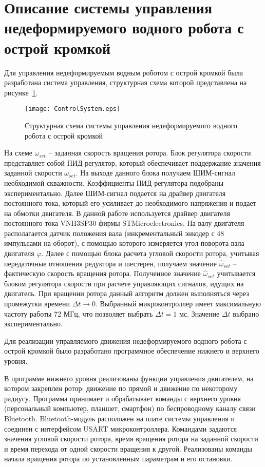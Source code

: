\section{Описание системы управления недеформируемого водного робота с острой кромкой}

Для управления недеформируемым водным роботом с острой кромкой была разработана система управления, структурная схема которой представлена на рисунке~\ref{ControlSystem}.

\begin{figure}[!h]
	\centering
	\texttt{[image: ControlSystem.eps]}
	\caption{Структурная схема системы управления недеформируемого водного робота с острой кромкой}
	\label{ControlSystem}
\end{figure}

На схеме $ \omega_{set} $ -- заданная скорость вращения ротора. Блок регулятора скорости представляет собой ПИД-регулятор, который обеспечивает поддержание значения заданной скорости $ \omega_{set} $. На выходе данного блока получаем ШИМ-сигнал необходимой скважности. Коэффициенты ПИД-регулятора подобраны экспериментально. Далее ШИМ-сигнал подается на драйвер двигателя постоянного тока, который его усиливает до необходимого напряжения и подает на обмотки двигателя. В данной работе используется драйвер двигателя постоянного тока VNH3SP30 фирмы STMicroelectronics. На валу двигателя располагается датчик положения вала (инкрементальный энкодер с 48 импульсами на оборот), с помощью которого измеряется угол поворота вала двигателя $ \varphi $. Далее с помощью блока расчета угловой скорости ротора, учитывая передаточные отношения редуктора и шестерен, получаем значение $ \hat{\omega}_{set} $ -- фактическую скорость вращения ротора. Полученное значение $ \hat{\omega}_{set} $ учитывается блоком регулятора скорости при расчете управляющих сигналов, идущих на двигатель. При вращении ротора данный алгоритм должен выполняться через промежутки времени $ \Delta t \rightarrow 0 $. Выбранный микроконтроллер имеет максимальную частоту работы 72 МГц, что позволяет выбрать $ \Delta t = 1 $ мс. Значение $ \Delta t $ выбрано экспериментально.

Для реализации управляемого движения недеформируемого водного робота с острой кромкой было разработано программное обеспечение нижнего и верхнего уровня.

В программе нижнего уровня реализованы функции управления двигателем, на котором закреплен ротор: движение по прямой и движение по некоторому радиусу. Программа принимает и обрабатывает команды с верхнего уровня (персональный компьютер, планшет, смартфон) по беспроводному каналу связи Bluetooth. Bluetooth-модуль расположен на плате системы управления и соединен с интерфейсом USART микроконтроллера. Командами задаются значения угловой скорости ротора, время вращения ротора на заданной скорости и время перехода от одной скорости вращения к другой. Реализованы команды начала вращения ротора по установленным параметрам и его остановки.


